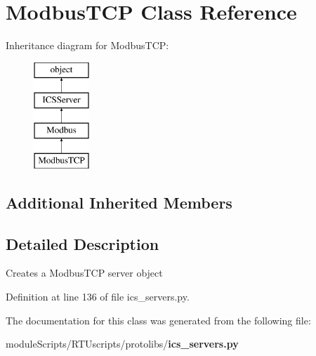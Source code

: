 \section{Modbus\+T\+C\+P Class Reference}
\label{classprotolibs_1_1ics__servers_1_1_modbus_t_c_p}
Inheritance diagram for Modbus\+T\+C\+P\+:\begin{figure}[H]
\begin{center}
\leavevmode
\includegraphics[height=4.000000cm]{classprotolibs_1_1ics__servers_1_1_modbus_t_c_p}
\end{center}
\end{figure}
\subsection*{Additional Inherited Members}


\subsection{Detailed Description}
\begin{DoxyVerb}Creates a ModbusTCP server object\end{DoxyVerb}
 

Definition at line 136 of file ics\+\_\+servers.\+py.



The documentation for this class was generated from the following file\+:\begin{DoxyCompactItemize}
\item 
module\+Scripts/\+R\+T\+Uscripts/protolibs/{\bf ics\+\_\+servers.\+py}\end{DoxyCompactItemize}
